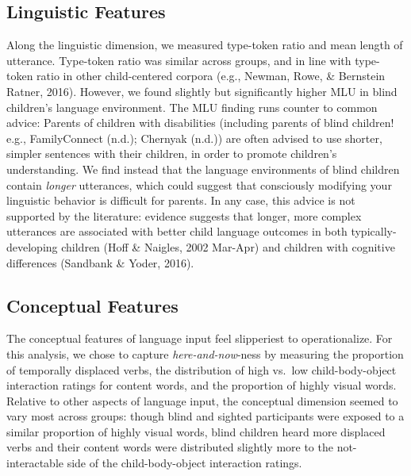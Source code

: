 \documentclass[
  man,floatsintext]{apa6}
\begin{document}
\hypertarget{linguistic-features-2}{%
\subsection{Linguistic Features}\label{linguistic-features-2}}

Along the linguistic dimension, we measured type-token ratio and mean length of utterance. Type-token ratio was similar across groups, and in line with type-token ratio in other child-centered corpora (e.g., Newman, Rowe, \& Bernstein Ratner, 2016). However, we found slightly but significantly higher MLU in blind children's language environment. The MLU finding runs counter to common advice: Parents of children with disabilities (including parents of blind children! e.g., FamilyConnect (n.d.); Chernyak (n.d.)) are often advised to use shorter, simpler sentences with their children, in order to promote children's understanding. We find instead that the language environments of blind children contain \emph{longer} utterances, which could suggest that consciously modifying your linguistic behavior is difficult for parents. In any case, this advice is not supported by the literature: evidence suggests that longer, more complex utterances are associated with better child language outcomes in both typically-developing children (Hoff \& Naigles, 2002 Mar-Apr) and children with cognitive differences (Sandbank \& Yoder, 2016).

\hypertarget{conceptual-features-2}{%
\subsection{Conceptual Features}\label{conceptual-features-2}}

The conceptual features of language input feel slipperiest to operationalize. For this analysis, we chose to capture \emph{here-and-now}-ness by measuring the proportion of temporally displaced verbs, the distribution of high vs.~low child-body-object interaction ratings for content words, and the proportion of highly visual words. Relative to other aspects of language input, the conceptual dimension seemed to vary most across groups: though blind and sighted participants were exposed to a similar proportion of highly visual words, blind children heard more displaced verbs and their content words were distributed slightly more to the not-interactable side of the child-body-object interaction ratings.
\end{document}
